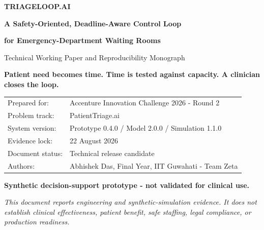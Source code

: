 \documentclass[11pt,a4paper]{article}
\newcommand{\prototype}{\textbf{Synthetic decision-support prototype - not validated for clinical use.}}
\begin{document}
\begin{titlepage}
\pagecolor{TPaper}
\color{TInk}
\vspace*{18mm}
{\Large\bfseries\color{TBrand} TRIAGELOOP.AI\par}
\vspace{7mm}
{\LARGE\bfseries A Safety-Oriented, Deadline-Aware Control Loop\par}
\vspace{2mm}
{\LARGE\bfseries for Emergency-Department Waiting Rooms\par}
\vspace{5mm}
{\Large Technical Working Paper and Reproducibility Monograph\par}
\vspace{12mm}
\noindent\colorbox{TBrand}{\parbox{0.94\textwidth}{\vspace{4mm}\color{white}\Large\bfseries Patient need becomes time. Time is tested against capacity. A clinician closes the loop.\vspace{4mm}}}
\vfill
\begin{tabular}{@{}ll@{}}
Prepared for: & Accenture Innovation Challenge 2026 - Round 2 \\
Problem track: & PatientTriage.ai \\
System version: & Prototype 0.4.0 / Model 2.0.0 / Simulation 1.1.0 \\
Evidence lock: & 22 August 2026 \\
Document status: & Technical release candidate \\
Authors: & Abhishek Das, Final Year, IIT Guwahati - Team Zeta \\
\end{tabular}
\vspace{10mm}

\prototype

\textit{This document reports engineering and synthetic-simulation evidence. It does not establish clinical effectiveness, patient benefit, safe staffing, legal compliance, or production readiness.}
\end{titlepage}
\nopagecolor
\end{document}
